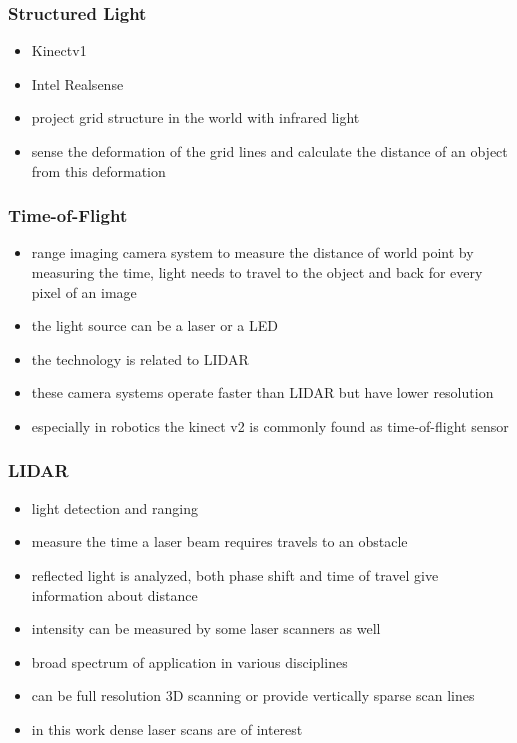 \subsubsection{Structured Light}

\begin{itemize}
    \item Kinectv1
    \item Intel Realsense
    \item project grid structure in the world with infrared light
    \item sense the deformation of the grid lines and calculate the distance of an object from this deformation
\end{itemize}

\subsubsection{Time-of-Flight}

\begin{itemize}
    \item range imaging camera system to measure the distance of world point by measuring the time, light needs to travel to the object and back for every pixel of an image
    \item the light source can be a laser or a LED
    \item the technology is related to LIDAR
    \item these camera systems operate faster than LIDAR but have lower resolution
    \item especially in robotics the kinect v2 is commonly found as time-of-flight sensor
\end{itemize}

\subsubsection{LIDAR}

\begin{itemize}
    \item light detection and ranging
    \item measure the time a laser beam requires travels to an obstacle
    \item reflected light is analyzed, both phase shift and time of travel give information about distance
    \item intensity can be measured by some laser scanners as well
    \item broad spectrum of application in various disciplines
    \item can be full resolution 3D scanning or provide vertically sparse scan lines
    \item in this work dense laser scans are of interest
\end{itemize}

